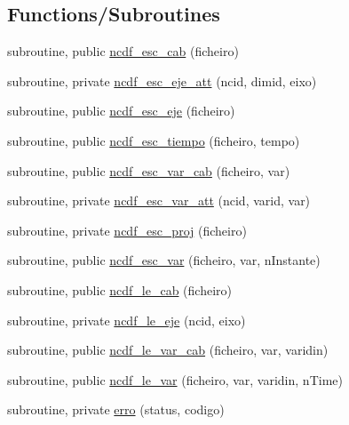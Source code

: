 \subsection*{Functions/\+Subroutines}
\begin{DoxyCompactItemize}
\item 
subroutine, public \mbox{\hyperlink{namespacencdflib_a513dad5b1d92a6ff5006b8c276dc1076}{ncdf\+\_\+esc\+\_\+cab}} (ficheiro)
\item 
subroutine, private \mbox{\hyperlink{namespacencdflib_a9357ce05485fdb83f341289a30c10ce1}{ncdf\+\_\+esc\+\_\+eje\+\_\+att}} (ncid, dimid, eixo)
\item 
subroutine, public \mbox{\hyperlink{namespacencdflib_a15543143f5feb2ff655f4b60aeae5354}{ncdf\+\_\+esc\+\_\+eje}} (ficheiro)
\item 
subroutine, public \mbox{\hyperlink{namespacencdflib_a70418482c5ffef91933942850702610f}{ncdf\+\_\+esc\+\_\+tiempo}} (ficheiro, tempo)
\item 
subroutine, public \mbox{\hyperlink{namespacencdflib_a5a3613be95873626820a361a60fb2876}{ncdf\+\_\+esc\+\_\+var\+\_\+cab}} (ficheiro, var)
\item 
subroutine, private \mbox{\hyperlink{namespacencdflib_acbe4ff328732b4674512c190b8c2d5b5}{ncdf\+\_\+esc\+\_\+var\+\_\+att}} (ncid, varid, var)
\item 
subroutine, private \mbox{\hyperlink{namespacencdflib_ab26646e33f23098c9a84e29cc33af7bc}{ncdf\+\_\+esc\+\_\+proj}} (ficheiro)
\item 
subroutine, public \mbox{\hyperlink{namespacencdflib_a948c992e922b3d6f18e5f3bbb27b5266}{ncdf\+\_\+esc\+\_\+var}} (ficheiro, var, n\+Instante)
\item 
subroutine, public \mbox{\hyperlink{namespacencdflib_a92c4f01a8b6a24a838eab2dc25d7d062}{ncdf\+\_\+le\+\_\+cab}} (ficheiro)
\item 
subroutine, private \mbox{\hyperlink{namespacencdflib_a6381f85426e3ba879b031f6feae929c1}{ncdf\+\_\+le\+\_\+eje}} (ncid, eixo)
\item 
subroutine, public \mbox{\hyperlink{namespacencdflib_add9998fa9d635bb8d35f562f55be98a3}{ncdf\+\_\+le\+\_\+var\+\_\+cab}} (ficheiro, var, varidin)
\item 
subroutine, public \mbox{\hyperlink{namespacencdflib_ac0842e227620b638b2a5474d6e1b441f}{ncdf\+\_\+le\+\_\+var}} (ficheiro, var, varidin, n\+Time)
\item 
subroutine, private \mbox{\hyperlink{namespacencdflib_a67d87694106e0b29a70cb174d730d570}{erro}} (status, codigo)
\end{DoxyCompactItemize}
